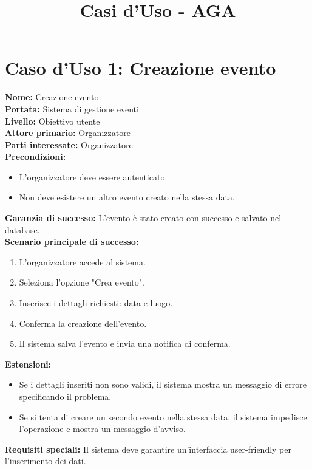 \documentclass[a4paper,12pt]{article}
\title{\textcolor{titlecolor}{\Huge Casi d'Uso - AGA \\ \text{Formato Dettagliato}}}
\author{}
\date{}
\begin{document}
\maketitle

\section*{\textcolor{sectioncolor}{Caso d'Uso 1: Creazione evento}}
\textcolor{textcolor}{
\textbf{Nome:} Creazione evento\\
\textbf{Portata:} Sistema di gestione eventi\\
\textbf{Livello:} Obiettivo utente\\
\textbf{Attore primario:} Organizzatore\\
\textbf{Parti interessate:} Organizzatore\\
\textbf{Precondizioni:}
\begin{itemize}
    \item L'organizzatore deve essere autenticato.
    \item Non deve esistere un altro evento creato nella stessa data.
\end{itemize}
\textbf{Garanzia di successo:} L'evento \`e stato creato con successo e salvato nel database.\\
\textbf{Scenario principale di successo:}
\begin{enumerate}
    \item L'organizzatore accede al sistema.
    \item Seleziona l'opzione "Crea evento".
    \item Inserisce i dettagli richiesti: data e luogo.
    \item Conferma la creazione dell'evento.
    \item Il sistema salva l'evento e invia una notifica di conferma.
\end{enumerate}
\textbf{Estensioni:}
\begin{itemize}
    \item Se i dettagli inseriti non sono validi, il sistema mostra un messaggio di errore specificando il problema.
    \item Se si tenta di creare un secondo evento nella stessa data, il sistema impedisce l'operazione e mostra un messaggio d'avviso.
\end{itemize}
\textbf{Requisiti speciali:} Il sistema deve garantire un'interfaccia user-friendly per l'inserimento dei dati.
}
\end{document}
